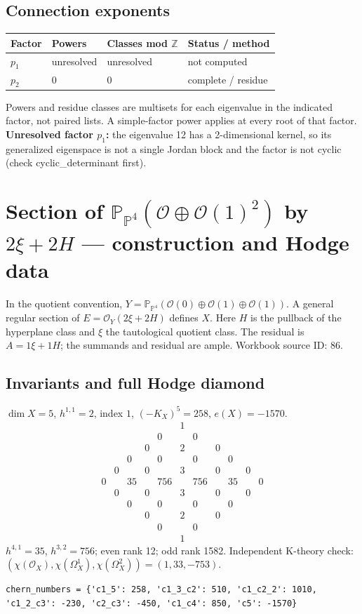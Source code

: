 \documentclass[10pt,a4paper]{article}
\begin{document}
\subsection*{Connection exponents}
\begin{center}\begin{tabular}{llll}\toprule Factor & Powers & Classes mod $\mathbb Z$ & Status / method\\\midrule
$p_{1}$ & unresolved & unresolved & not computed\\
$p_{2}$ & $0$ & $0$ & complete / residue\\
\bottomrule\end{tabular}\end{center}
Powers and residue classes are multisets for each eigenvalue in the indicated factor, not paired lists. A simple-factor power applies at every root of that factor.
\textbf{Unresolved factor $p_{1}$:} the eigenvalue 12 has a 2-dimensional kernel, so its generalized eigenspace is not a single Jordan block and the factor is not cyclic (check cyclic\_determinant first).
\clearpage\section*{Section of $\mathbb P_{\mathbb P^{4}}(\mathcal O\oplus \mathcal O(1)^{2})$ by $2\xi +2H$ --- construction and Hodge data}\label{entry:PB5-086}
In the quotient convention, $Y=\mathbb P_{\mathbb P^{4}}(\mathcal O(0)\oplus\mathcal O(1)\oplus\mathcal O(1))$.
A general regular section of $E=\mathcal O_Y(2\xi+2H)$ defines $X$.
Here $H$ is the pullback of the hyperplane class and $\xi$ the tautological quotient class. The residual is $A=1\xi+1H$; the summands and residual are ample.
Workbook source ID: 86.
\subsection*{Invariants and full Hodge diamond}
$\dim X=5$, $h^{1,1}=2$, index $1$, $(-K_X)^5=258$, $e(X)=-1570$.
\[\begin{array}{ccccccccccc}&&&&&1&&&&&\\&&&&0&&0&&&&\\&&&0&&2&&0&&&\\&&0&&0&&0&&0&&\\&0&&0&&3&&0&&0&\\0&&35&&756&&756&&35&&0\\&0&&0&&3&&0&&0&\\&&0&&0&&0&&0&&\\&&&0&&2&&0&&&\\&&&&0&&0&&&&\\&&&&&1&&&&&\end{array}\]
$h^{4,1}=35$, $h^{3,2}=756$; even rank 12; odd rank 1582.
Independent K-theory check: $(\chi(\mathcal O_X),\chi(\Omega_X^1),\chi(\Omega_X^2))=(1, 33, -753)$.
\begin{lstlisting}
chern_numbers = {'c1_5': 258, 'c1_3_c2': 510, 'c1_c2_2': 1010, 'c1_2_c3': -230, 'c2_c3': -450, 'c1_c4': 850, 'c5': -1570}
\end{lstlisting}
\end{document}
